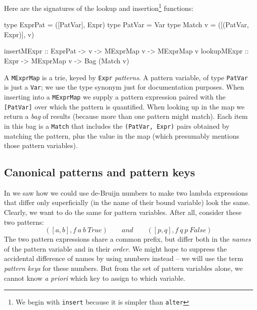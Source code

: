 \documentclass[acmsmall]{acmart}
\theoremstyle{theorem}
\theoremstyle{definition}
\theoremstyle{remark}
\begin{document}
Here are the signatures of the lookup and insertion\footnote{We begin with \lstinline{insert}
  because it is simpler than \lstinline{alter}} functions:
\begin{code}
type ExprPat = ([PatVar], Expr)
type PatVar  = Var
type Match v = ([(PatVar, Expr)], v)

insertMExpr :: ExprPat -> v -> MExprMap v -> MExprMap v
lookupMExpr :: Expr -> MExprMap v -> Bag (Match v)
\end{code}
A \lstinline{MExprMap} is a trie, keyed by \lstinline{Expr} \emph{patterns}.
A pattern variable, of type \lstinline{PatVar} is just a \lstinline{Var}; we
use the type synonym just for documentation purposes. When inserting into a
\lstinline{MExprMap} we supply a pattern expression paired with the \lstinline{[PatVar]}
over which the pattern is quantified.  When looking up in the map we return a \emph{bag}
of results (because more than one pattern might match).  Each item in this bag is
a \lstinline{Match} that includes the \lstinline{(PatVar, Expr)} pairs obtained by
matching the pattern, plus the value in the map (which presumably mentions those
pattern variables).


\subsection{Canonical patterns and pattern keys}

In  we saw how we could use de-Bruijn numbers to
make two lambda expressions that differ only superficially (in the
name of their bound variable) look the same.  Clearly, we want to do
the same for pattern variables.  After all, consider these two patterns:
$$
([a,b], f~a~b~True) \qquad and \qquad ([p,q], f~q~p~False)
$$
The two pattern expressions share a common prefix, but differ both in the
\emph{names} of the pattern variable and in their \emph{order}. We might hope
to suppress the accidental difference of names by using numbers instead -- we will
use the term \emph{pattern keys} for these numbers.
But from the set of pattern variables alone, we
cannot know \emph{a priori} which key to assign to which variable.
\end{document}

